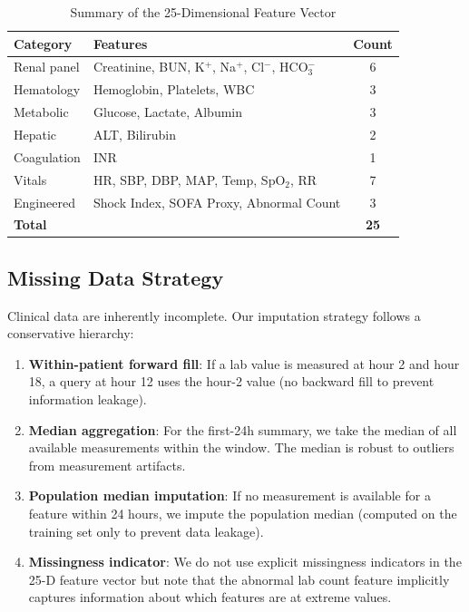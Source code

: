 \begin{table}[htbp]
\centering
\caption{Summary of the 25-Dimensional Feature Vector}
\small
\begin{tabular}{llc}
\toprule
\textbf{Category} & \textbf{Features} & \textbf{Count} \\
\midrule
Renal panel & Creatinine, BUN, K$^+$, Na$^+$, Cl$^-$, HCO$_3^-$ & 6 \\
Hematology & Hemoglobin, Platelets, WBC & 3 \\
Metabolic & Glucose, Lactate, Albumin & 3 \\
Hepatic & ALT, Bilirubin & 2 \\
Coagulation & INR & 1 \\
Vitals & HR, SBP, DBP, MAP, Temp, SpO$_2$, RR & 7 \\
Engineered & Shock Index, SOFA Proxy, Abnormal Count & 3 \\
\midrule
\textbf{Total} & & \textbf{25} \\
\bottomrule
\end{tabular}
\label{tab:feature_summary}
\end{table}

\subsection{Missing Data Strategy}

Clinical data are inherently incomplete. Our imputation strategy follows a conservative hierarchy:
\begin{enumerate}
\item \textbf{Within-patient forward fill}: If a lab value is measured at hour 2 and hour 18, a query at hour 12 uses the hour-2 value (no backward fill to prevent information leakage).
\item \textbf{Median aggregation}: For the first-24h summary, we take the median of all available measurements within the window. The median is robust to outliers from measurement artifacts.
\item \textbf{Population median imputation}: If no measurement is available for a feature within 24 hours, we impute the population median (computed on the training set only to prevent data leakage).
\item \textbf{Missingness indicator}: We do not use explicit missingness indicators in the 25-D feature vector but note that the abnormal lab count feature implicitly captures information about which features are at extreme values.
\end{enumerate}

